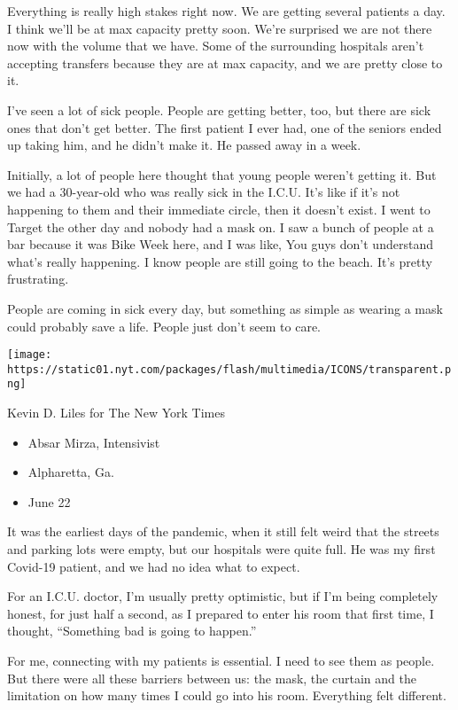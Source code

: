 Everything is really high stakes right now. We are getting several
patients a day. I think we'll be at max capacity pretty soon. We're
surprised we are not there now with the volume that we have. Some of the
surrounding hospitals aren't accepting transfers because they are at max
capacity, and we are pretty close to it.

I've seen a lot of sick people. People are getting better, too, but
there are sick ones that don't get better. The first patient I ever had,
one of the seniors ended up taking him, and he didn't make it. He passed
away in a week.

Initially, a lot of people here thought that young people weren't
getting it. But we had a 30-year-old who was really sick in the I.C.U.
It's like if it's not happening to them and their immediate circle, then
it doesn't exist. I went to Target the other day and nobody had a mask
on. I saw a bunch of people at a bar because it was Bike Week here, and
I was like, You guys don't understand what's really happening. I know
people are still going to the beach. It's pretty frustrating.

People are coming in sick every day, but something as simple as wearing
a mask could probably save a life. People just don't seem to care.

\texttt{[image: https://static01.nyt.com/packages/flash/multimedia/ICONS/transparent.png]}

Kevin D. Liles for The New York Times

\begin{itemize}
\tightlist
\item
  Absar Mirza, Intensivist
\item
  Alpharetta, Ga.
\item
  June 22
\end{itemize}

It was the earliest days of the pandemic, when it still felt weird that
the streets and parking lots were empty, but our hospitals were quite
full. He was my first Covid-19 patient, and we had no idea what to
expect.

For an I.C.U. doctor, I'm usually pretty optimistic, but if I'm being
completely honest, for just half a second, as I prepared to enter his
room that first time, I thought, ``Something bad is going to happen.''

For me, connecting with my patients is essential. I need to see them as
people. But there were all these barriers between us: the mask, the
curtain and the limitation on how many times I could go into his room.
Everything felt different.

